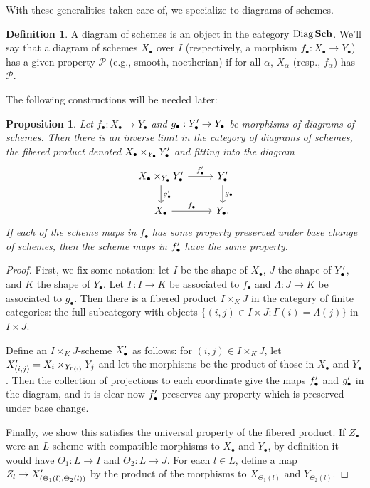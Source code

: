 \documentclass{report}
\newtheorem{prop}[theorem]{Proposition}
\theoremstyle{definition}
\newtheorem{definition}[theorem]{Definition}
\DeclareMathOperator{\Diag}{Diag}
\DeclareMathOperator{\Sch}{{\bf Sch}}
\begin{document}
With these generalities taken care of, we specialize to diagrams of schemes.

\begin{definition}
	A diagram of schemes is an object in the category $\Diag \Sch$.
	We'll say that a diagram of schemes $X_\bullet$ over $I$ (respectively, a morphism $f_\bullet : X_\bullet \rightarrow Y_\bullet$) has a given property $\mathcal{P}$ (e.g., smooth, noetherian) if for all $\alpha$, $X_\alpha$ (resp., $f_\alpha$) has $\mathcal{P}$.
\end{definition}
The following constructions will be needed later:

\begin{prop}
	\label{thm:fiberedprod}
	Let $f_\bullet : X_\bullet \rightarrow Y_\bullet$ and $g_\bullet : Y_\bullet\rq{} \rightarrow Y_\bullet$ be morphisms of diagrams of schemes.
	Then there is an inverse limit in the category of diagrams of schemes, the fibered product denoted $X_\bullet \times_{Y_\bullet} Y_\bullet\rq{}$ and fitting into the diagram
	\[
	\begin{tikzcd}
	X_\bullet \times_{Y_\bullet} Y_\bullet\rq{} \arrow{r}{f_\bullet\rq{}} \arrow{d}{g_\bullet\rq{}} & Y_\bullet\rq{} \arrow{d}{g_\bullet} \\
	X_\bullet \arrow{r}{f_\bullet} & Y_\bullet.
	\end{tikzcd}
	\]
	If each of the scheme maps in $f_\bullet$ has some property preserved under base change of schemes, then the scheme maps in $f_\bullet\rq{}$ have the same property.
\end{prop}
\begin{proof}
	First, we fix some notation: let $I$ be the shape of $X_\bullet$, $J$ the shape of $Y_\bullet\rq{}$, and $K$ the shape of $Y_\bullet$.
	Let $\Gamma : I \rightarrow K$ be associated to $f_\bullet$ and $\Lambda : J \rightarrow K$ be associated to $g_\bullet$.
	Then there is a fibered product $I \times_K J$ in the category of finite categories: the full subcategory with objects $\{(i, j) \in I \times J : \Gamma(i) = \Lambda(j) \}$ in $I \times J$.
	
	Define an $I \times_K J$-scheme $X_\bullet\rq{}$ as follows: for $(i, j) \in I \times_K J$, let $X_{(i,j)}\rq{} = X_i \times_{Y_{\Gamma(i)}} Y_j$ and let the morphisms be the product of those in $X_\bullet$ and $Y_\bullet$.
	Then the collection of projections to each coordinate give the maps $f_\bullet\rq{}$ and $g_\bullet\rq{}$ in the diagram, and it is clear now $f_\bullet\rq{}$ preserves any property which is preserved under base change.
	
	Finally, we show this satisfies the universal property of the fibered product.
	If $Z_\bullet$ were an $L$-scheme with compatible morphisms to $X_\bullet$ and $Y_\bullet$, by definition it would have $\Theta_1 : L \rightarrow I$ and $\Theta_2 : L \rightarrow J$.
	For each $l \in L$, define a map $Z_l \rightarrow X_{(\Theta_1(l), \Theta_2(l))}\rq{}$ by the product of the morphisms to $X_{\Theta_1(l)}$ and $Y_{\Theta_2(l)}$.
\end{proof}
\end{document}
